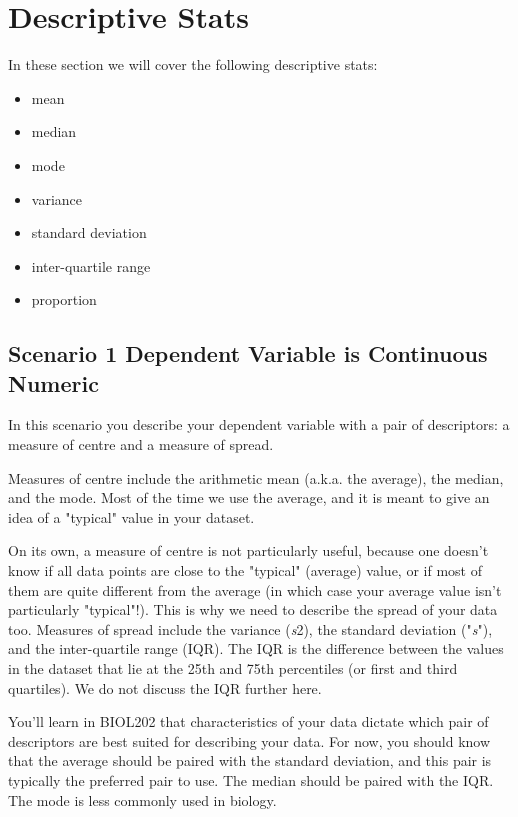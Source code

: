 \documentclass[
]{book}
\providecommand{\tightlist}{%
  \setlength{\itemsep}{0pt}\setlength{\parskip}{0pt}}
\begin{document}
\hypertarget{descriptive-stats}{%
\section*{Descriptive Stats}\label{descriptive-stats}}

In these section we will cover the following descriptive stats:

\begin{itemize}
\tightlist
\item
  mean
\item
  median
\item
  mode
\item
  variance
\item
  standard deviation
\item
  inter-quartile range
\item
  proportion
\end{itemize}

\hypertarget{scenario-1-dependent-variable-is-continuous-numeric}{%
\subsection*{Scenario 1 Dependent Variable is Continuous Numeric}\label{scenario-1-dependent-variable-is-continuous-numeric}}

In this scenario you describe your dependent variable with a pair of descriptors: a measure of centre and a measure of spread.

Measures of centre include the arithmetic mean (a.k.a. the average), the median, and the mode. Most of the time we use the average, and it is meant to give an idea of a "typical" value in your dataset.

On its own, a measure of centre is not particularly useful, because one doesn't know if all data points are close to the "typical" (average) value, or if most of them are quite different from the average (in which case your average value isn't particularly "typical"!). This is why we need to describe the spread of your data too. Measures of spread include the variance (\emph{s}2), the standard deviation ("\emph{s}"), and the inter-quartile range (IQR). The IQR is the difference between the values in the dataset that lie at the 25th and 75th percentiles (or first and third quartiles). We do not discuss the IQR further here.

You'll learn in BIOL202 that characteristics of your data dictate which pair of descriptors are best suited for describing your data. For now, you should know that the average should be paired with the standard deviation, and this pair is typically the preferred pair to use. The median should be paired with the IQR. The mode is less commonly used in biology.
\end{document}
